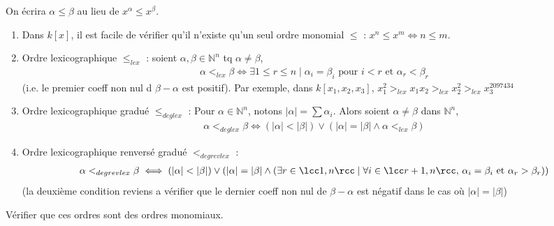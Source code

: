             \begin{nota}
                On écrira $\alpha \leq \beta$ au lieu de $x^\alpha \leq x^\beta$.
            \end{nota}
            \begin{expl}
                \begin{enumerate}
                    \item Dans $k[x]$, il est facile de vérifier qu'il n'existe qu'un seul ordre monomial $\leq$ : $x^n \leq x^m \iff n \leq m$.
                    \item Ordre lexicographique $\leq_{lex}$ : soient $\alpha, \beta \in \mathbb{N}^n$ tq $\alpha \neq \beta$,
                    \begin{align*}
                        \alpha <_{lex} \beta \iff \exists 1 \leq r \leq n \mid \alpha_i = \beta_i \text{ pour } i < r \text{ et } \alpha_r < \beta_r
                    \end{align*}
                    (i.e. le premier coeff non nul d $\beta - \alpha$ est positif). Par exemple, dans $k[x_1, x_2, x_3]$, $x_1^2 >_{lex} x_1x_2 >_{lex} x_2^2 >_{lex} x_3^{2097434}$
                    \item Ordre lexicographique gradué $\leq_{deglex}$ : Pour $\alpha \in \mathbb{N}^n$, notons $|\alpha| = \sum \alpha_i$. Alors soient $\alpha \neq \beta$ dans $\mathbb{N}^n$,
                    \begin{align*}
                        \alpha <_{deglex} \beta \iff (|\alpha| < |\beta|) \lor (|\alpha| = |\beta| \land \alpha <_{lex} \beta)
                    \end{align*}
                    \item Ordre lexicographique renversé gradué $<_{degrevlex}$ :
                    \begin{align*}
                        \alpha <_{degrevlex} \beta \iff (|\alpha| < |\beta|) \lor (|\alpha| = |\beta| \land (\exists r \in \lcc 1,n \rcc  \mid \forall i \in \lcc r+1, n \rcc,\, \alpha_i = \beta_i  \text{ et } \alpha_r > \beta_r))
                    \end{align*}
                    (la deuxième condition reviens a vérifier que le dernier coeff non nul de $\beta - \alpha$ est négatif dans le cas où $|\alpha| = |\beta|$)
                \end{enumerate}
            \end{expl} \noindent
            \begin{exo}
                Vérifier que ces ordres sont des ordres monomiaux.
            \end{exo} \noindent
